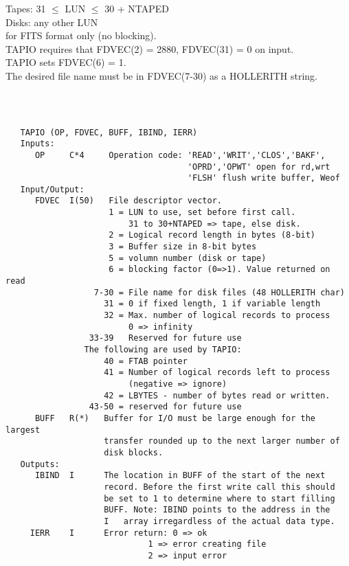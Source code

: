 Tapes:  31 $\le $ LUN $\le $ 30 + NTAPED\\

Disks: any other LUN\\
for FITS format only (no blocking).\\
TAPIO requires that FDVEC(2) = 2880, FDVEC(31) = 0 on input.\\
TAPIO sets FDVEC(6) = 1.\\
The desired file name must be in FDVEC(7-30) as a HOLLERITH string.\\
\begin{verbatim}



   TAPIO (OP, FDVEC, BUFF, IBIND, IERR)
   Inputs:
      OP     C*4     Operation code: 'READ','WRIT','CLOS','BAKF',
                                     'OPRD','OPWT' open for rd,wrt
                                     'FLSH' flush write buffer, Weof
   Input/Output:
      FDVEC  I(50)   File descriptor vector.
                     1 = LUN to use, set before first call.
                         31 to 30+NTAPED => tape, else disk.
                     2 = Logical record length in bytes (8-bit)
                     3 = Buffer size in 8-bit bytes
                     5 = volumn number (disk or tape)
                     6 = blocking factor (0=>1). Value returned on read
                  7-30 = File name for disk files (48 HOLLERITH char)
                    31 = 0 if fixed length, 1 if variable length
                    32 = Max. number of logical records to process
                         0 => infinity
                 33-39   Reserved for future use
                The following are used by TAPIO:
                    40 = FTAB pointer
                    41 = Number of logical records left to process
                         (negative => ignore)
                    42 = LBYTES - number of bytes read or written.
                 43-50 = reserved for future use
      BUFF   R(*)   Buffer for I/O must be large enough for the largest
                    transfer rounded up to the next larger number of
                    disk blocks.
   Outputs:
      IBIND  I      The location in BUFF of the start of the next
                    record. Before the first write call this should
                    be set to 1 to determine where to start filling
                    BUFF. Note: IBIND points to the address in the
                    I   array irregardless of the actual data type.
     IERR    I      Error return: 0 => ok
                             1 => error creating file
                             2 => input error

\end{verbatim}
